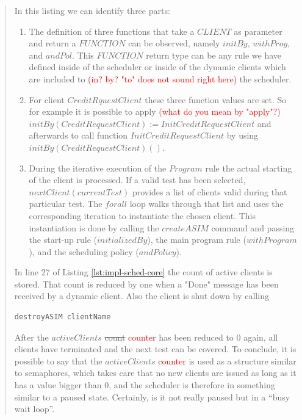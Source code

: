 \begin{quote}
In this listing we can identify three parts:
\begin{enumerate}
\item The definition of three functions that take a $CLIENT$ as parameter and return a $FUNCTION$ can be observed, namely $initBy$, $withProg$, and $andPol$. This $FUNCTION$ return type can be any rule we have defined inside of the scheduler or inside of the dynamic clients which are included to \textcolor{red}{(in? by? "to" does not sound right here)} the scheduler.
\item For client $CreditRquestClient$ these three function values are set. So for example it is possible to apply \textcolor{red}{(what do you mean by "apply"?)} $initBy(CreditRequestClient) := InitCreditRequestClient$ and afterwards to call function $InitCreditRequestClient$ by using  $initBy(CreditRequestClient)()$.
\item During the iterative execution of the $Program$ rule the actual starting of the client is processed. If a valid test has been selected, $nextClient(currentTest)$ provides a list of clients valid during that particular test. The $forall$ loop walks through that list and uses the corresponding iteration to instantiate the chosen client. This instantiation is done by calling the $createASIM$ command and passing the start-up rule ($initializedBy$), the main program rule ($withProgram$), and the scheduling policy ($andPolicy$).
\end{enumerate}


In line 27 of Listing \ref{lst:impl-sched-core} the count of active clients is stored. That count is reduced by one when a "Done" message has been received by a dynamic client. Also the client is shut down by calling

\begin{lstlisting}[language=bsl]
	destroyASIM clientName
\end{lstlisting}

After the $activeClients$ \st{count} \textcolor{red}{counter} has been reduced to $0$ again, all clients have terminated and the next test can be covered. To conclude, it is possible to say that the $activeClients$ \textcolor{red}{counter} is used as a structure similar to semaphores, which takes care that no new clients are issued as long as it has a value bigger than $0$, and the scheduler is therefore in something similar to a paused state. Certainly, is it not really paused but in a ``busy wait loop''.

\end{quote}

